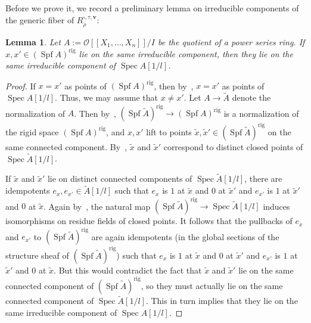 \documentclass{amsart}
\newtheorem{lemma}[subsubsection]{Lemma}
\theoremstyle{definition}
\theoremstyle{remark}
\newcommand{\cO}{{\mathcal O}}
\DeclareMathOperator{\Spec}{Spec}
\DeclareMathOperator{\Spf}{Spf}
\newcommand{\rhobar}{\overline{\rho}}
\begin{document}
Before we prove it, we record a preliminary lemma on irreducible components of the generic fiber of $R_{\rhobar}^{\square,\tau,\mathbf{v}}$:
\begin{lemma}\label{lemma: analytify irred cpts}
Let $A:=\cO[\![X_1,\ldots,X_n]\!]/I$ be the quotient of a power series ring.  If $x,x'\in (\Spf A)^{\mathrm{rig}}$ lie on the same irreducible component, then they lie on the same irreducible component of $\Spec A[1/l]$.
\end{lemma}
\begin{proof}
If $x=x'$ as points of $(\Spf A)^{\mathrm{rig}}$, then by~\cite[Lemma 7.1.9]{dejong-formalrigid}, $x=x'$ as points of $\Spec A[1/l]$.  Thus, we may assume that $x\neq x'$.  Let $A\rightarrow \widetilde A$ denote the normalization of $A$.  Then by~\cite[Theorem 2.1.3]{conrad-rigid-irred-cpts}, $(\Spf \widetilde A)^{\mathrm{rig}}\rightarrow (\Spf A)^{\mathrm{rig}}$ is a normalization of the rigid space $(\Spf A)^{\mathrm{rig}}$, and $x, x'$ lift to points $\widetilde x, \widetilde x'\in (\Spf \widetilde A)^{\mathrm{rig}}$ on the same connected component.  By~\cite[Lemma 7.1.9]{dejong-formalrigid}, $\widetilde x$ and $\widetilde x'$ correspond to distinct closed points of $\Spec \widetilde{A}[1/l]$.

If $\widetilde x$ and $\widetilde x'$ lie on distinct connected components of $\Spec \widetilde{A}[1/l]$, there are idempotents $e_x, e_{x'}\in \widetilde{A}[1/l]$ such that $e_x$ is $1$ at $\widetilde x$ and $0$ at $\widetilde x'$ and $e_{x'}$ is $1$ at $\widetilde x'$ and $0$ at $\widetilde x$.  Again by~\cite[Lemma 7.1.9]{dejong-formalrigid}, the natural map $(\Spf \widetilde A)^{\mathrm{rig}}\rightarrow \Spec \widetilde A[1/l]$ induces isomorphisms on residue fields of closed points.  It follows that the pullbacks of $e_x$ and $e_{x'}$ to $(\Spf \widetilde A)^{\mathrm{rig}}$ are again idempotents (in the global sections of the structure sheaf of $(\Spf \widetilde A)^{\mathrm{rig}}$) such that $e_x$ is $1$ at $\widetilde x$ and $0$ at $\widetilde x'$ and $e_{x'}$ is $1$ at $\widetilde x'$ and $0$ at $\widetilde x$.  But this would contradict the fact that $\widetilde x$ and $\widetilde x'$ lie on the same connected component of $(\Spf \widetilde A)^{\mathrm{rig}}$, so they must actually lie on the same connected component of $\Spec \widetilde{A}[1/l]$.  This in turn implies that they lie on the same irreducible component of $\Spec A[1/l]$.
\end{proof}
\end{document}
